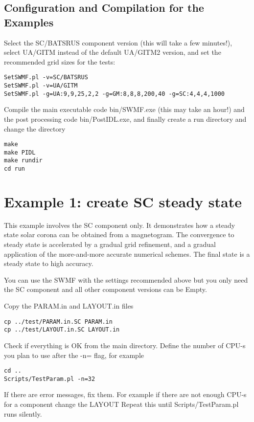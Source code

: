 \subsection{Configuration and Compilation for the Examples}

Select the SC/BATSRUS component version (this will take a few minutes!),
select UA/GITM instead of the default UA/GITM2 version, 
and set the recommended grid sizes for the tests:
\begin{verbatim}
SetSWMF.pl -v=SC/BATSRUS
SetSWMF.pl -v=UA/GITM
SetSWMF.pl -g=UA:9,9,25,2,2 -g=GM:8,8,8,200,40 -g=SC:4,4,4,1000
\end{verbatim}

Compile the main executable code bin/SWMF.exe (this may take an hour!)
and the post processing code bin/PostIDL.exe,
and finally create a run directory and change the directory
\begin{verbatim}
make
make PIDL
make rundir
cd run
\end{verbatim}

\section{Example 1: create SC steady state}

This example involves the SC component only. It demonstrates
how a steady state solar corona can be obtained from
a magnetogram. The convergence to steady state is accelerated by 
a gradual grid refinement, and a gradual application of the
more-and-more accurate numerical schemes. The final state
is a steady state to high accuracy. 

You can use the SWMF with the settings recommended above
but you only need the SC component and
all other component versions can be Empty.

Copy the PARAM.in and LAYOUT.in files
\begin{verbatim}
cp ../test/PARAM.in.SC PARAM.in
cp ../test/LAYOUT.in.SC LAYOUT.in
\end{verbatim}

Check if everything is OK from the main directory.
Define the number of CPU-s you plan to use after the -n= flag,
for example
\begin{verbatim}
cd ..
Scripts/TestParam.pl -n=32
\end{verbatim}

If there are error messages, fix them. 
For example if there are not enough CPU-s for a component change the LAYOUT
Repeat this until Scripts/TestParam.pl runs silently.

